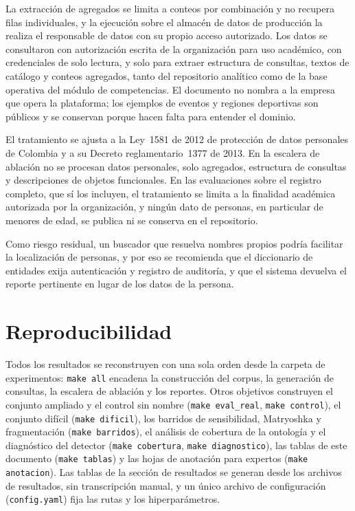 \documentclass[11pt,letterpaper]{article}
\numberwithin{equation}{section}
\begin{document}
La extracción de agregados se limita a conteos por combinación y no recupera filas individuales, y la ejecución sobre el almacén de datos de producción la realiza el responsable de datos con su propio acceso autorizado. Los datos se consultaron con autorización escrita de la organización para uso académico, con credenciales de solo lectura, y solo para extraer estructura de consultas, textos de catálogo y conteos agregados, tanto del repositorio analítico como de la base operativa del módulo de competencias.
El documento no nombra a la empresa que opera la plataforma; los ejemplos de eventos y regiones deportivas son públicos y se conservan porque hacen falta para entender el dominio.

El tratamiento se ajusta a la Ley~1581 de 2012 de protección de datos personales de Colombia y a su Decreto reglamentario~1377 de 2013. En la escalera de ablación no se procesan datos personales, solo agregados, estructura de consultas y descripciones de objetos funcionales. En las evaluaciones sobre el registro completo, que sí los incluyen, el tratamiento se limita a la finalidad académica autorizada por la organización, y ningún dato de personas, en particular de menores de edad, se publica ni se conserva en el repositorio.

Como riesgo residual, un buscador que resuelva nombres propios podría facilitar la localización de personas, y por eso se recomienda que el diccionario de entidades exija autenticación y registro de auditoría, y que el sistema devuelva el reporte pertinente en lugar de los datos de la persona.

\section{Reproducibilidad}
\label{sec:reproducibilidad}
Todos los resultados se reconstruyen con una sola orden desde la carpeta de experimentos: \texttt{make all} encadena la construcción del corpus, la generación de consultas, la escalera de ablación y los reportes. Otros objetivos construyen el conjunto ampliado y el control sin nombre (\texttt{make eval\_real}, \texttt{make control}), el conjunto difícil (\texttt{make dificil}), los barridos de sensibilidad, Matryoshka y fragmentación (\texttt{make barridos}), el análisis de cobertura de la ontología y el diagnóstico del detector (\texttt{make cobertura}, \texttt{make diagnostico}), las tablas de este documento (\texttt{make tablas}) y las hojas de anotación para expertos (\texttt{make anotacion}). Las tablas de la sección de resultados se generan desde los archivos de resultados, sin transcripción manual, y un único archivo de configuración (\texttt{config.yaml}) fija las rutas y los hiperparámetros.
\end{document}
